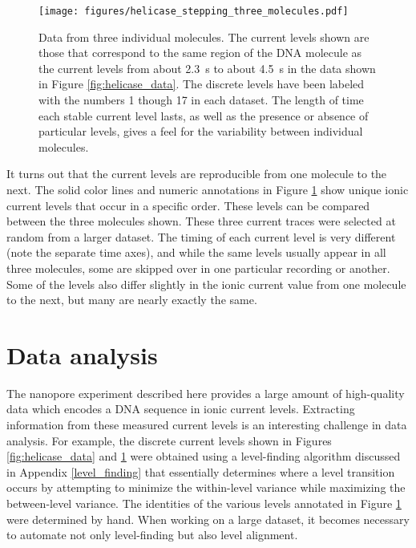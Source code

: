 \begin{figure}[H]
\begin{centering}
\texttt{[image: figures/helicase\_stepping\_three\_molecules.pdf]}
\caption[Helicase stepping along three DNA molecules]{Data from three individual molecules.  The current levels shown are those that correspond to the same region of the DNA molecule as the current levels from about \SI{2.3}{\s} to about \SI{4.5}{\s} in the data shown in Figure \ref{fig:helicase_data}.  The discrete levels have been labeled with the numbers \num{1} though \num{17} in each dataset.  The length of time each stable current level lasts, as well as the presence or absence of particular levels, gives a feel for the variability between individual molecules.}
\label{fig:helicase_data_3}
\end{centering}
\end{figure}

It turns out that the current levels are reproducible from one molecule to the next.  The solid color lines and numeric annotations in Figure \ref{fig:helicase_data_3} show unique ionic current levels that occur in a specific order.  These levels can be compared between the three molecules shown.  These three current traces were selected at random from a larger dataset.  The timing of each current level is very different (note the separate time axes), and while the same levels usually appear in all three molecules, some are skipped over in one particular recording or another.  Some of the levels also differ slightly in the ionic current value from one molecule to the next, but many are nearly exactly the same.

\section{Data analysis}

The nanopore experiment described here provides a large amount of high-quality data which encodes a DNA sequence in ionic current levels.  Extracting information from these measured current levels is an interesting challenge in data analysis.  For example, the discrete current levels shown in Figures \ref{fig:helicase_data} and \ref{fig:helicase_data_3} were obtained using a level-finding algorithm discussed in Appendix \ref{level_finding} that essentially determines where a level transition occurs by attempting to minimize the within-level variance while maximizing the between-level variance.  The identities of the various levels annotated in Figure \ref{fig:helicase_data_3} were determined by hand.  When working on a large dataset, it becomes necessary to automate not only level-finding but also level alignment.

